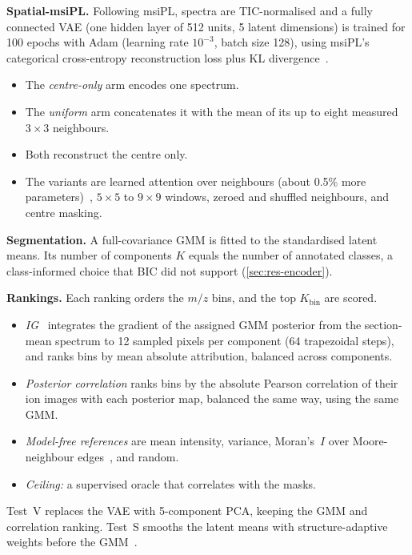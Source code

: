 \textbf{Spatial-msiPL.} Following msiPL, spectra are TIC-normalised and a fully
connected VAE (one hidden layer of 512 units, 5 latent dimensions) is trained
for 100 epochs with Adam (learning rate $10^{-3}$, batch size 128), using
msiPL's categorical cross-entropy reconstruction loss plus KL
divergence~\citep{abdelmoula2021peak}.
\begin{itemize}
  \item The \emph{centre-only} arm encodes one spectrum.
  \item The \emph{uniform} arm concatenates it with the mean of its up to eight
        measured $3\times3$ neighbours.
  \item Both reconstruct the centre only.
  \item The variants are learned attention over neighbours (about 0.5\% more
        parameters)~\citep{vaswani2017attention}, $5\times5$ to $9\times9$
        windows, zeroed and shuffled neighbours, and centre masking.
\end{itemize}

\textbf{Segmentation.} A full-covariance GMM is fitted to the standardised
latent means. Its number of components $K$ equals the number of annotated
classes, a class-informed choice that BIC did not support
(\cref{sec:res-encoder}).

\textbf{Rankings.} Each ranking orders the $m/z$ bins, and the top
$K_{\text{bin}}$ are scored.
\begin{itemize}
  \item \emph{IG}~\citep{sundararajan2017axiomatic} integrates the gradient of
        the assigned GMM posterior from the section-mean spectrum to 12 sampled
        pixels per component (64 trapezoidal steps), and ranks bins by mean
        absolute attribution, balanced across components.
  \item \emph{Posterior correlation} ranks bins by the absolute Pearson
        correlation of their ion images with each posterior map, balanced the
        same way, using the same GMM.
  \item \emph{Model-free references} are mean intensity, variance, Moran's~$I$
        over Moore-neighbour edges~\citep{moran1950notes}, and random.
  \item \emph{Ceiling:} a supervised oracle that correlates with the masks.
\end{itemize}
Test~V replaces the VAE with 5-component PCA, keeping the GMM and correlation
ranking. Test~S smooths the latent means with structure-adaptive weights before
the GMM~\citep{alexandrov2011efficient}.

